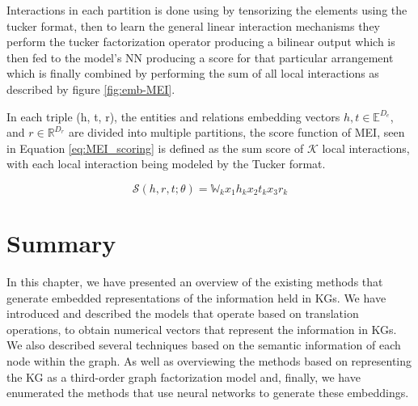 Interactions in each partition is done using by tensorizing the elements using the tucker format\cite{tucker1966some}, then to learn the general linear interaction mechanisms they perform the tucker factorization operator producing a bilinear output which is then fed to the model's NN producing a score for that particular arrangement which is finally combined by performing the sum of all local interactions as described by figure \ref{fig:emb-MEI}.

In each triple (h, t, r), the entities and relations embedding vectors $h, t \in \mathbb{E}^{D_e}$, and $r \in \mathbb{R}^{D_r}$ are divided into multiple partitions, the score function of MEI, seen in Equation \ref{eq:MEI_scoring} is defined as the sum score of $\mathcal{K}$ local interactions, with each local interaction being modeled by the Tucker format.

\begin{equation}
    \label{eq:MEI_scoring}
    \mathcal{S}(h, r, t; \theta) = \mathbb{W}_k x_1 h_k x_2 t_k x_3 r_k
\end{equation}

\section{Summary}\label{sec:emb-summary}
In this chapter, we have presented an overview of the existing methods that generate embedded representations of the information held in KGs. 
We have introduced and described the models that operate based on translation operations, to obtain numerical vectors that represent the information in KGs. We also described several techniques based on the semantic information of each node within the graph. As well as overviewing the methods based on representing the KG as a third-order graph factorization model and, finally, we have enumerated the methods that use neural networks to generate these embeddings.